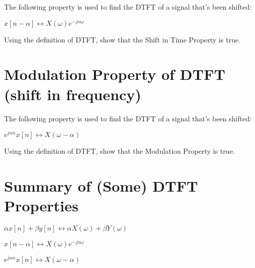 \documentclass[11pt]{article}
\begin{document}
The following property is used to find the DTFT of a signal that's been shifted: \newline

\begin{center}

$
x[n - \alpha]  \longleftrightarrow  X(\omega) e^{- j \alpha \omega}
$
\end{center}

\vspace{4mm}

Using the definition of DTFT, show that the Shift in Time Property is true. 


\section{Modulation Property of DTFT (shift in frequency)}

The following property is used to find the DTFT of a signal that's been shifted: \newline

\begin{center}

$
e^{j \alpha n} x[n]  \longleftrightarrow  X(\omega - \alpha)
$
\end{center}

\vspace{4mm}

Using the definition of DTFT, show that the Modulation Property is true.

\vspace{5mm}

\section{Summary of (Some) DTFT Properties}

\vspace{3mm}


\begin{center}
$
\alpha x[n] + \beta y[n] \longleftrightarrow  \alpha X(\omega) + \beta Y(\omega)
$

\end{center}
\begin{center}
$
x[n - \alpha]  \longleftrightarrow  X(\omega) e^{- j \alpha \omega}
$

\end{center}


\begin{center}

$
e^{j \alpha n} x[n]  \longleftrightarrow  X(\omega - \alpha)
$
\end{center}
\end{document}
